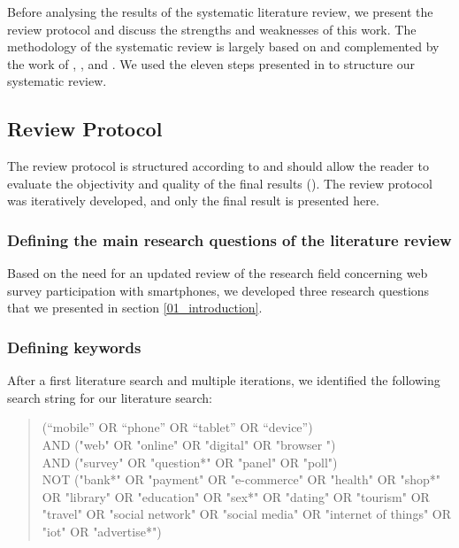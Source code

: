 Before analysing the results of the systematic literature review, we present the review protocol and discuss the strengths and weaknesses of this work. The methodology of the systematic review is largely based on \cite{silva_systematic_2016} and complemented by the work of \cite{xiao_guidance_2017}, \cite{petticrew_systematic_2008}, \cite{snyder_literature_2019} and \cite{denyer_producing_2009}. We used the eleven steps presented in \cite{silva_systematic_2016} to structure our systematic review.

\subsection{Review Protocol}

The review protocol is structured according to \cite{silva_systematic_2016} and should allow the reader to evaluate the objectivity and quality of the final results (\cite{page_prisma_2021}). The review protocol was iteratively developed, and only the final result is presented here.


\subsubsection{Defining the main research questions of the literature review}

Based on the need for an updated review of the research field concerning web survey participation with smartphones, we developed three research questions that we presented in section \ref{01_introduction}.

\subsubsection{Defining keywords}
\label{subsubsec: Defining search string}

After a first literature search and multiple iterations, we identified the following search string for our literature search:

\begin{quote}
(“mobile” OR “phone” OR “tablet” OR “device”) \\
AND ("web" OR "online" OR "digital" OR "browser ")  \\
AND ("survey" OR "question*" OR "panel" OR "poll")  \\
NOT ("bank*" OR "payment" OR "e-commerce" OR "health" OR "shop*" OR "library" OR "education" OR "sex*" OR "dating" OR "tourism" OR "travel" OR "social network" OR "social media" OR "internet of things" OR "iot" OR "advertise*")
\end{quote}

